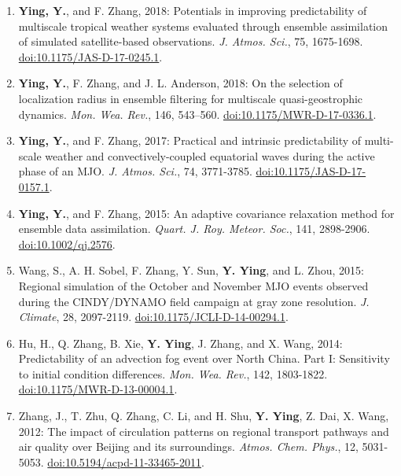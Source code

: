 \begin{enumerate}
\item \textbf{Ying, Y.}, and F. Zhang, 2018: Potentials in improving predictability of multiscale tropical weather systems evaluated through ensemble assimilation of simulated satellite-based observations. 
\textit{J. Atmos. Sci.}, 75, 1675-1698. 
\href{https://doi.org/10.1175/JAS-D-17-0245.1}{doi:10.1175/JAS-D-17-0245.1}.

\item \textbf{Ying, Y.}, F. Zhang, and J. L. Anderson, 2018: On the selection of localization radius in ensemble filtering for multiscale quasi-geostrophic dynamics. 
\textit{Mon. Wea. Rev.}, 146, 543–560. 
\href{https://doi.org/10.1175/MWR-D-17-0336.1}{doi:10.1175/MWR-D-17-0336.1}.

\item \textbf{Ying, Y.}, and F. Zhang, 2017: Practical and intrinsic predictability of multi-scale weather and convectively-coupled equatorial waves during the active phase of an MJO. 
\textit{J. Atmos. Sci.}, 74, 3771-3785. 
\href{https://doi.org/10.1175/JAS-D-17-0157.1}{doi:10.1175/JAS-D-17-0157.1}.

\item \textbf{Ying, Y.}, and F. Zhang, 2015: An adaptive covariance relaxation method for ensemble data assimilation. 
\textit{Quart. J. Roy. Meteor. Soc.}, 141, 2898-2906. 
\href{https://doi.org/10.1002/qj.2576}{doi:10.1002/qj.2576}.

\item Wang, S., A. H. Sobel, F. Zhang, Y. Sun, \textbf{Y. Ying}, and L. Zhou, 2015: Regional simulation of the October and November MJO events observed during the CINDY/DYNAMO field campaign at gray zone resolution. 
\textit{J. Climate}, 28, 2097-2119. 
\href{https://doi.org/10.1175/JCLI-D-14-00294.1}{doi:10.1175/JCLI-D-14-00294.1}.

\item Hu, H., Q. Zhang, B. Xie, \textbf{Y. Ying}, J. Zhang, and X. Wang, 2014: Predictability of an advection fog event over North China. Part I: Sensitivity to initial condition differences. 
\textit{Mon. Wea. Rev.}, 142, 1803-1822. 
\href{https://doi.org/10.1175/MWR-D-13-00004.1}{doi:10.1175/MWR-D-13-00004.1}.

\item Zhang, J., T. Zhu, Q. Zhang, C. Li, and H. Shu, \textbf{Y. Ying}, Z. Dai, X. Wang, 2012: The impact of circulation patterns on regional transport pathways and air quality over Beijing and its surroundings. 
\textit{Atmos. Chem. Phys.}, 12, 5031-5053. 
\href{https://doi.org/10.5194/acpd-11-33465-2011}{doi:10.5194/acpd-11-33465-2011}.


\end{enumerate}
